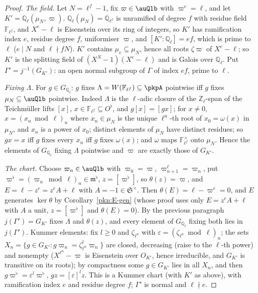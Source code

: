 \documentclass[10pt]{amsart}
\theoremstyle{definition}
\theoremstyle{remark}
\newcommand{\Z}{\mathbb Z}
\newcommand{\Q}{\mathbb Q}
\begin{document}
\begin{proof}
\emph{The field.} Let $N=\ell^f-1$, fix $\varpi\in\auQlb$ with $\varpi^e=\ell$, and let
$K'=\Q_\ell(\mu_N,\varpi)$. $\Q_\ell(\mu_N)=\Q_{\ell^f}$ is unramified of degree $f$ with residue field
$\mathbb F_{\ell^f}$, and $X^e-\ell$ is Eisenstein over its ring of integers, so $K'$ has ramification index
$e$, residue degree $f$, uniformiser $\varpi$, and $[K':\Q_\ell]=ef$, which is prime to $\ell$ ($e\mid N$
and $\ell\nmid fN$). $K'$ contains $\mu_e\subseteq\mu_N$, hence all roots $\zeta\varpi$ of $X^e-\ell$; so $K'$
is the splitting field of $(X^N-1)(X^e-\ell)$ and is Galois over $\Q_\ell$. Put $\Gamma'=j^{-1}(G_{K'})$: an
open normal subgroup of $\Gamma$ of index $ef$, prime to $\ell$.

\emph{Fixing $\Lambda$.} For $g\in G_{\Q_\ell}$: $g$ fixes $\Lambda=W(\mathbb F_{\ell^f})\subseteq\pkpA$
pointwise iff $g$ fixes $\mu_N\subseteq\auQlb$ pointwise. Indeed $\Lambda$ is the $\ell$-adic closure of the
$\Z_\ell$-span of the Teichm\"uller lifts $[x]$, $x\in\mathbb F_{\ell^f}\subseteq O^\flat$, and $g[x]=[gx]$;
for $x\ne0$, $x=(x_n\bmod\ell)_n$ where $x_n\in\mu_N$ is the unique $\ell^n$-th root of $x_0=\omega(x)$
in $\mu_N$, and $x_n$ is a power of $x_0$; distinct elements of $\mu_N$ have distinct residues; so $gx=x$
iff $g$ fixes every $x_n$ iff $g$ fixes $\omega(x)$; and $\omega$ maps $\mathbb F_{\ell^f}^\times$ onto
$\mu_N$. Hence the elements of $G_{\Q_\ell}$ fixing $\Lambda$ pointwise and $\varpi$ are exactly those of
$G_{K'}$.

\emph{The chart.} Choose $\varpi_n\in\auQlb$ with $\varpi_0=\varpi$, $\varpi_{n+1}^\ell=\varpi_n$, put
$\varpi^\flat=(\varpi_n\bmod\ell)_n\in\mathfrak m^\flat$, $z=[\varpi^\flat]$, so $\theta(z)=\varpi$, and
$E=\ell-z^e=z^eA+\ell$ with $A=-1\in\mathfrak S^\times$. Then $\theta(E)=\ell-\varpi^e=0$, and $E$
generates $\ker\theta$ by Corollary~\ref{pkn:E-gen} (whose proof uses only $E=z^eA+\ell$ with $A$ a unit,
$z=[\varpi^\flat]$ and $\theta(E)=0$). By the previous paragraph $j(\Gamma')=G_{K'}$ fixes $\Lambda$ and
$\theta(z)$, and every element of $G_{\Q_\ell}$ fixing both lies in $j(\Gamma')$. Kummer elements: fix
$l\ge0$ and $\zeta_{\ell^n}$ with $\varepsilon=(\zeta_{\ell^n}\bmod\ell)_n$; the sets
$X_n=\{g\in G_{K'}:g\varpi_n=\zeta_{\ell^n}^l\varpi_n\}$ are closed, decreasing (raise to the $\ell$-th power)
and nonempty ($X^{\ell^n}-\varpi$ is Eisenstein over $O_{K'}$, hence irreducible, and $G_{K'}$ is transitive
on its roots); by compactness some $g\in G_{K'}$ lies in all $X_n$, and then $g\varpi^\flat=
\varepsilon^l\varpi^\flat$, $gz=[\varepsilon]^lz$. This is a Kummer chart (with $K'$ as above), with
ramification index $e$ and residue degree $f$; $\Gamma'$ is normal and $\ell\nmid e$.


\end{proof}
\end{document}
